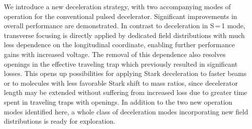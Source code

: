 \documentclass[%
 reprint,
 amsmath,amssymb,
 aps,
prl,
]{revtex4-1}
\begin{document}
We introduce a new deceleration strategy, with two accompanying modes of operation for the conventional pulsed decelerator. 
Significant improvements in overall performance are demonstrated.
In contrast to deceleration in S\,=\,1 mode, transverse focusing is directly applied by dedicated field distributions with much less dependence on the longitudinal coordinate, enabling further performance gains with increased voltage.
The removal of this dependence also resolves openings in the effective traveling trap which previously resulted in significant losses.
This opens up possibilities for applying Stark deceleration to faster beams or to molecules with less favorable Stark shift to mass ratios, since decelerator length may be extended without suffering from increased loss due to greater time spent in traveling traps with openings.
In addition to the two new operation modes identified here, a whole class of deceleration modes incorporating new field distributions is ready for exploration.





\end{document}
